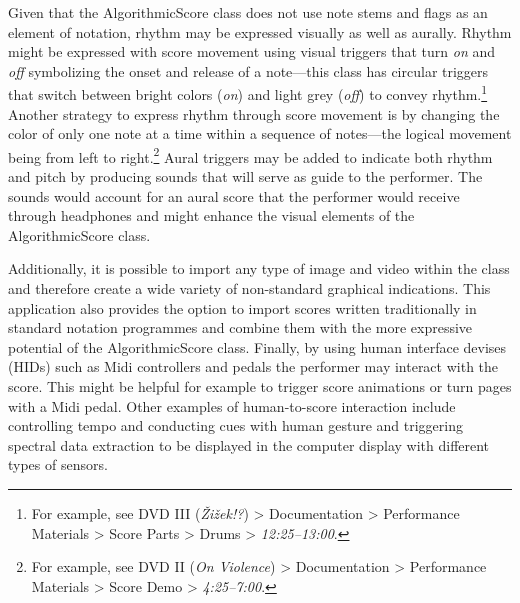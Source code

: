 Given that the AlgorithmicScore class does not use note stems and flags as an element of notation, rhythm may be expressed visually as well as aurally. Rhythm might be expressed with score movement using visual triggers that turn \emph{on} and \emph{off} symbolizing the onset and release of a note---this class has circular triggers that switch between bright colors (\emph{on}) and light grey (\emph{off}) to convey rhythm.\footnote{For example, see DVD III (\emph{\v{Z}i\v{z}ek!?}) \tiny \textgreater \footnotesize \hspace{0pt} Documentation \tiny \textgreater \footnotesize \hspace{0pt} Performance Materials \tiny \textgreater \footnotesize \hspace{0pt} Score Parts \tiny \textgreater \footnotesize \hspace{0pt} Drums \tiny \textgreater \footnotesize \hspace{0pt} \mbox{\emph{12:25--13:00}}.} Another strategy to express rhythm through score movement is by changing the color of only one note at a time within a sequence of notes---the logical movement being from left to right.\footnote{For example, see DVD II (\emph{On Violence}) \tiny \textgreater \footnotesize \hspace{0pt} Documentation \tiny \textgreater \footnotesize \hspace{0pt} Performance Materials \tiny \textgreater \footnotesize \hspace{0pt} Score Demo \tiny \textgreater \footnotesize  \hspace{0pt} \mbox{\emph{4:25--7:00}}.} Aural triggers may be added to indicate both rhythm and pitch by producing sounds that will serve as guide to the performer. The sounds would account for an aural score that the performer would receive through headphones and might enhance the visual elements of the AlgorithmicScore class.

Additionally, it is possible to import any type of image and video within the class and therefore create a wide variety of non-standard graphical indications. This application also provides the option to import scores written traditionally in standard notation programmes and combine them with the more expressive potential of the AlgorithmicScore class. Finally, by using human interface devises (HIDs) such as Midi controllers and pedals the performer may interact with the score. This might be helpful for example to trigger score animations or turn pages with a Midi pedal. Other examples of human-to-score interaction include controlling tempo and conducting cues with human gesture and triggering spectral data extraction to be displayed in the computer display with different types of sensors. 

